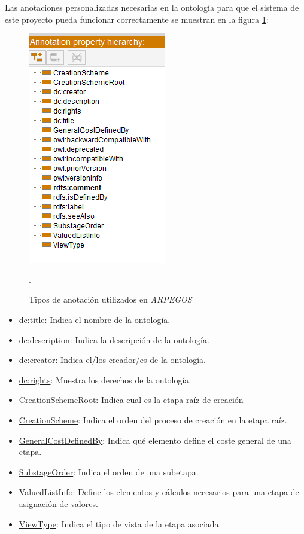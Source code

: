Las anotaciones personalizadas necesarias en la ontología para que el sistema de este proyecto pueda 
funcionar correctamente se muestran en la figura \ref*{Custom_Annotation_Types}:

\begin{figure}[ht]
    \centering
    \includegraphics[scale=0.6]{Figures/Protege/Custom_Annotation_Types.png}
    \caption{Tipos de anotación utilizados en \textit{ARPEGOS}}.
    \label{Custom_Annotation_Types}
\end{figure}

\begin{itemize}
    \item \underline{dc:title}: Indica el nombre de la ontología.
    \item \underline{dc:description}: Indica la descripción de la ontología.
    \item \underline{dc:creator}: Indica el/los creador/es de la ontología.
    \item \underline{dc:rights}: Muestra los derechos de la ontología.
    \item \underline{CreationSchemeRoot}: Indica cual es la etapa raíz de creación
    \item \underline{CreationScheme}: Indica el orden del proceso de creación en la etapa raíz.
    \item \underline{GeneralCostDefinedBy}: Indica qué elemento define el coste general de una etapa.
    \item \underline{SubstageOrder}: Indica el orden de una subetapa.
    \item \underline{ValuedListInfo}: Define los elementos y cálculos necesarios para una etapa de asignación de valores.
    \item \underline{ViewType}: Indica el tipo de vista de la etapa asociada.
\end{itemize}

